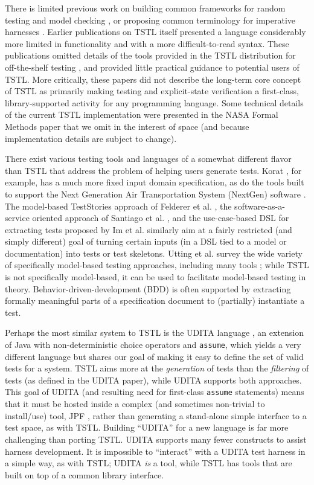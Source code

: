 There is limited previous work on
building common frameworks for random testing and model checking
\cite{woda08}, or proposing common terminology for imperative
harnesses \cite{woda12}.  Earlier publications on TSTL itself \cite{NFM15,ISSTA15} presented a
language considerably more limited in functionality and with a more
difficult-to-read syntax.  These publications omitted details of the tools provided in the TSTL distribution for
off-the-shelf testing \cite{tstl}, and provided little practical
guidance to potential users of TSTL.  More critically, these papers
did not describe the long-term core concept of TSTL as primarily
making testing and explicit-state verification
a first-class, library-supported activity for any programming
language.  Some technical
details of the current TSTL implementation were presented in the NASA
Formal Methods paper \cite{NFM15} that we omit in
the interest of space (and because implementation details are subject
to change).

There exist various testing tools and languages of a somewhat
different flavor than TSTL that address the problem of helping
users generate tests.   Korat \cite{Korat}, for example, has a much more fixed
input domain specification, as do the tools built to support the Next
Generation Air Transportation System (NextGen) software
\cite{TameInputs}. The model-based TestStories approach of Felderer et
al. \cite{TestStories}, the software-as-a-service oriented approach of
Santiago et al. \cite{Santiago}, and the use-case-based DSL for extracting tests
proposed by Im et al. \cite{AutoDSL} similarly aim at a fairly
restricted (and simply different) goal of turning certain inputs (in a DSL tied to a model or
documentation) into tests or test skeletons.  Utting et al. survey the wide variety of
specifically model-based testing approaches, including many tools
\cite{Taxonomy}; while TSTL is not specifically model-based, it can be
used to facilitate model-based testing in theory.
Behavior-driven-development (BDD) \cite{BDD} is often supported by extracting
formally meaningful parts of a specification document to (partially)
instantiate a test.  




Perhaps the most similar system to TSTL is the UDITA language
\cite{UDITA}, an extension of Java with non-deterministic choice
operators and {\tt assume}, which yields a very different language
but shares our goal of making it easy to define the set of valid
tests for a system.  TSTL aims more at the \emph{generation} of
tests than the \emph{filtering} of tests (as defined in the UDITA
paper), while UDITA supports both approaches.  This goal of UDITA (and
resulting need for first-class {\tt assume} statements) means that it
must be hosted inside a complex (and sometimes non-trivial to
install/use) tool, JPF \cite{JPF2}, rather than generating a
stand-alone simple interface to a test space, as with TSTL.  Building
``UDITA'' for a new language is far more challenging than porting
TSTL.  UDITA supports many fewer constructs to assist harness
development.  It is impossible to ``interact'' with a UDITA test
harness in a simple way, as with TSTL; UDITA \emph{is} a tool, while TSTL has
tools that are built on top of a common library interface.

